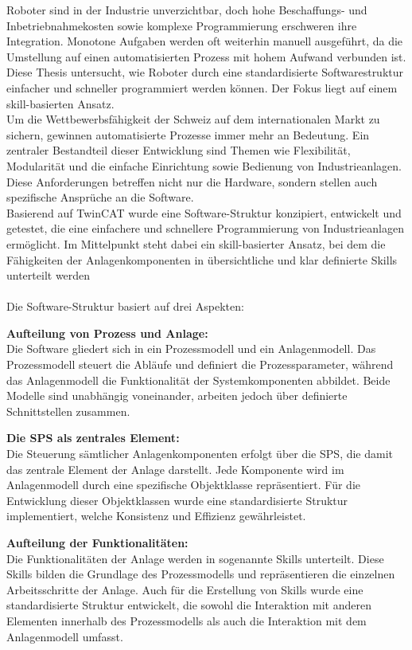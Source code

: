 Roboter sind in der Industrie unverzichtbar, doch hohe Beschaffungs- und Inbetriebnahmekosten sowie komplexe Programmierung erschweren ihre Integration. Monotone Aufgaben werden oft weiterhin manuell ausgeführt, da die Umstellung auf einen automatisierten Prozess mit hohem Aufwand verbunden ist. Diese Thesis untersucht, wie Roboter durch eine standardisierte Softwarestruktur einfacher und schneller programmiert werden können. Der Fokus liegt auf einem skill-basierten Ansatz.
\\
Um die Wettbewerbsfähigkeit der Schweiz auf dem internationalen Markt zu sichern, gewinnen automatisierte Prozesse immer mehr an Bedeutung. Ein zentraler Bestandteil dieser Entwicklung sind Themen wie Flexibilität, Modularität und die einfache Einrichtung sowie Bedienung von Industrieanlagen. Diese Anforderungen betreffen nicht nur die Hardware, sondern stellen auch spezifische Ansprüche an die Software.
\\
Basierend auf TwinCAT wurde eine Software-Struktur konzipiert, entwickelt und getestet, die eine einfachere und schnellere Programmierung von Industrieanlagen ermöglicht. Im Mittelpunkt steht dabei ein skill-basierter Ansatz, bei dem die Fähigkeiten der Anlagenkomponenten in übersichtliche und klar definierte Skills unterteilt werden
\\
\\
Die Software-Struktur basiert auf drei Aspekten:

\textbf{Aufteilung von Prozess und Anlage:} \vspace{2mm} 
\\
Die Software gliedert sich in ein Prozessmodell und ein Anlagenmodell. Das Prozessmodell steuert die Abläufe und definiert die Prozessparameter, während das Anlagenmodell die Funktionalität der Systemkomponenten abbildet. Beide Modelle sind unabhängig voneinander, arbeiten jedoch über definierte Schnittstellen zusammen.

\textbf{Die \Gls{SPS} als zentrales Element:} \vspace{2mm} 
\\
Die Steuerung sämtlicher Anlagenkomponenten erfolgt über die \Gls{SPS}, die damit das zentrale Element der Anlage darstellt. Jede Komponente wird im Anlagenmodell durch eine spezifische Objektklasse repräsentiert. Für die Entwicklung dieser Objektklassen wurde eine standardisierte Struktur implementiert, welche Konsistenz und Effizienz gewährleistet.

\textbf{Aufteilung der Funktionalitäten:} \vspace{2mm} 
\\
Die Funktionalitäten der Anlage werden in sogenannte Skills unterteilt. Diese Skills bilden die Grundlage des Prozessmodells und repräsentieren die einzelnen Arbeitsschritte der Anlage. Auch für die Erstellung von Skills wurde eine standardisierte Struktur entwickelt, die sowohl die Interaktion mit anderen Elementen innerhalb des Prozessmodells als auch die Interaktion mit dem Anlagenmodell umfasst.
